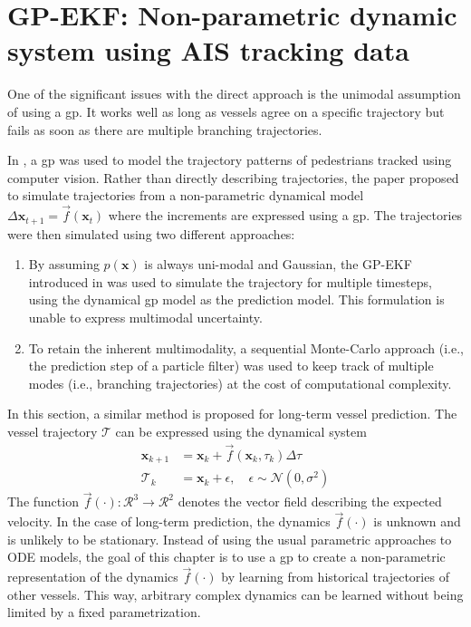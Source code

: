 \chapter{GP-EKF: Non-parametric dynamic system using AIS tracking data}
One of the significant issues with the direct approach is the unimodal assumption of using a \acrshort{gp}. It works well as long as vessels agree on a specific trajectory but fails as soon as there are multiple branching trajectories.

In \cite{pedestrian}, a \acrshort{gp} was used to model the trajectory patterns of pedestrians tracked using computer vision. Rather than directly describing trajectories, the paper proposed to simulate trajectories from a non-parametric dynamical model $\Delta\boldsymbol{x}_{t+1} = \vec{f}(\boldsymbol{x}_t)$ where the increments are expressed using a \acrshort{gp}. The trajectories were then simulated using two different approaches:
\begin{enumerate}
    \item By assuming $p(\boldsymbol{x})$ is always uni-modal and Gaussian, the GP-EKF introduced in \cite{gpekf} was used to simulate the trajectory for multiple timesteps, using the dynamical \acrshort{gp} model as the prediction model. This formulation is unable to express multimodal uncertainty.
    \item To retain the inherent multimodality, a sequential Monte-Carlo approach (i.e., the prediction step of a particle filter) was used to keep track of multiple modes (i.e., branching trajectories) at the cost of computational complexity.
\end{enumerate}

In this section, a similar method is proposed for long-term vessel prediction. The vessel trajectory $\boldsymbol{\mathcal{T}}$ can be expressed using the dynamical system
\begin{subequations}
    \begin{align}
        \boldsymbol{x}_{k+1}       & = \boldsymbol{x}_k + \vec{f}(\boldsymbol{x}_k,\tau_k)\Delta \tau                          \\
        \boldsymbol{\mathcal{T}}_k & = \boldsymbol{x}_k + \epsilon, \quad \epsilon \sim \mathcal{N}(0, \sigma^2)
    \end{align}
\end{subequations}
The function $\vec{f}(\cdot): \mathcal{R}^3 \to \mathcal{R}^2$ denotes the vector field describing the expected velocity. In the case of long-term prediction, the dynamics $\vec{f}(\cdot)$ is unknown and is unlikely to be stationary. Instead of using the usual parametric approaches to ODE models, the goal of this chapter is to use a \acrshort{gp} to create a non-parametric representation of the dynamics $\vec{f}(\cdot)$ by learning from historical trajectories of other vessels. This way, arbitrary complex dynamics can be learned without being limited by a fixed parametrization.

